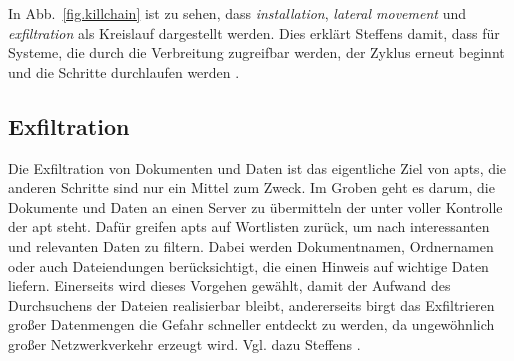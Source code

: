 \documentclass[conference]{IEEEtran}
\begin{document}
In Abb.~\ref{fig.killchain} ist zu sehen, dass \textit{installation}, \textit{lateral movement} und \textit{exfiltration} als Kreislauf dargestellt werden.
Dies erklärt Steffens damit, dass für Systeme, die durch die Verbreitung zugreifbar werden, der Zyklus erneut beginnt und die Schritte durchlaufen werden \cite[S.~18]{Steffens2020}.

\subsection{Exfiltration}

Die Exfiltration von Dokumenten und Daten ist das eigentliche Ziel von \acp{apt}, die anderen Schritte sind nur ein Mittel zum Zweck.
Im Groben geht es darum, die Dokumente und Daten an einen Server zu übermitteln der unter voller Kontrolle der \ac{apt} steht.
Dafür greifen \acp{apt} auf Wortlisten zurück, um nach interessanten und relevanten Daten zu filtern.
Dabei werden Dokumentnamen, Ordnernamen oder auch Dateiendungen berücksichtigt, die einen Hinweis auf wichtige Daten liefern.
Einerseits wird dieses Vorgehen gewählt, damit der Aufwand des Durchsuchens der Dateien realisierbar bleibt, andererseits birgt das Exfiltrieren großer Datenmengen die Gefahr schneller entdeckt zu werden, da ungewöhnlich großer Netzwerkverkehr erzeugt wird.
Vgl. dazu Steffens \cite[S.~18]{Steffens2020}.
\end{document}
